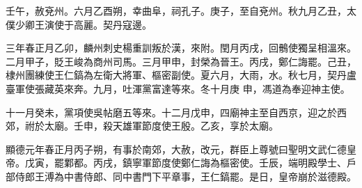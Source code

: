 \begin{pinyinscope}
 壬午，赦兗州。六月乙酉朔，幸曲阜，祠孔子。庚子，至自兗州。秋九月乙丑，太僕少卿王演使于高麗。契丹寇邊。



 三年春正月乙卯，麟州刺史楊重訓叛於漢，來附。閏月丙戌，回鶻使獨呈相溫來。二月甲子，貶王峻為商州司馬。三月甲申，封榮為晉王。丙戌，鄭仁誨罷。己丑，棣州團練使王仁鎬為左衛大將軍、樞密副使。夏六月，大雨，水。秋七月，契丹盧臺軍使張藏英來奔。九月，吐渾黨富達等來。冬十月庚
 申，馮道為奉迎神主使。



 十一月癸未，黨項使吳帖磨五等來。十二月戊申，四廟神主至自西京，迎之於西郊，祔於太廟。壬申，殺天雄軍節度使王殷。乙亥，享於太廟。



 顯德元年春正月丙子朔，有事於南郊，大赦，改元，群臣上尊號曰聖明文武仁德皇帝。戊寅，罷鄴都。丙戌，鎮寧軍節度使鄭仁誨為樞密使。壬辰，端明殿學士、戶部侍郎王溥為中書侍郎、同中書門下平章事，王仁鎬罷。是日，皇帝崩於滋德殿。



\end{pinyinscope}